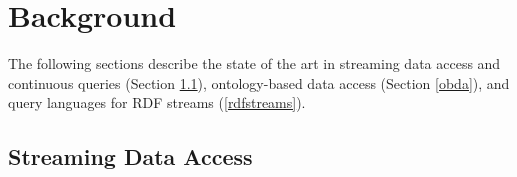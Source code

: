 \section{Background}
\label{previousworks}


The following sections describe the state of the art in streaming data access and continuous queries (Section \ref{datastreams}), ontology-based data access (Section \ref{obda}), and query languages for RDF streams (\ref{rdfstreams}).%



\subsection{Streaming Data Access}
\label{datastreams}


